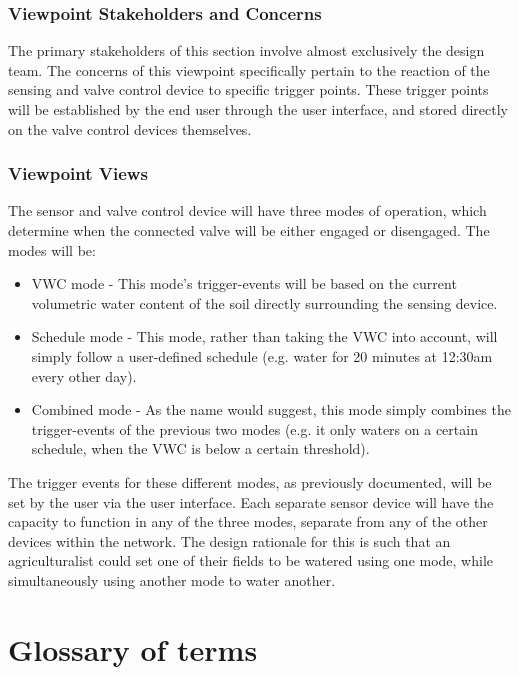 \documentclass[onecolumn, draftclsnofoot,10pt, compsoc]{IEEEtran}
\newcounter{subsubsubsection}[subsubsection]
\begin{document}
	\subsubsection{Viewpoint Stakeholders and Concerns}
	The primary stakeholders of this section involve almost exclusively the design team.
	The concerns of this viewpoint specifically pertain to the reaction of the sensing and valve control device to specific trigger points.
	These trigger points will be established by the end user through the user interface, and stored directly on the valve control devices themselves.
	\subsubsection{Viewpoint Views}
	The sensor and valve control device will have three modes of operation, which determine when the connected valve will be either engaged or disengaged.
	The modes will be:
	\begin{itemize}
		\item VWC mode - This mode's trigger-events will be based on the current volumetric water content of the soil directly surrounding the sensing device.
		\item Schedule mode - This mode, rather than taking the VWC into account, will simply follow a user-defined schedule (e.g. water for 20 minutes at 12:30am every other day).
		\item Combined mode - As the name would suggest, this mode simply combines the trigger-events of the previous two modes (e.g. it only waters on a certain schedule, when the VWC is below a certain threshold).
	\end{itemize}
	The trigger events for these different modes, as previously documented, will be set by the user via the user interface.
	Each separate sensor device will have the capacity to function in any of the three modes, separate from any of the other devices within the network.
	The design rationale for this is such that an agriculturalist could set one of their fields to be watered using one mode, while simultaneously using another mode to water another.
	\pagebreak
	\section{Glossary of terms}
	
	\pagebreak
	\nocite{*} %
	
	    
	
\end{document}
